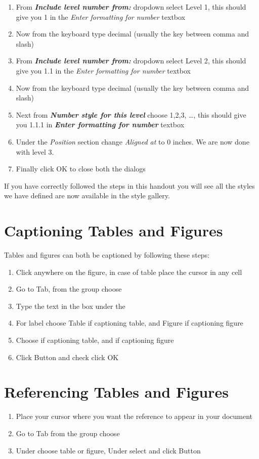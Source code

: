 \begin{enumerate}
    \item From \textbf{\emph{Include level number from: }} dropdown select Level 1, this should give you 1 in the \emph{Enter formatting for number} textbox
     \item Now from the keyboard type decimal (usually the key between comma and slash)
     \item From \textbf{\emph{Include level number from: }} dropdown select Level 2, this should give you 1.1 in the \emph{Enter formatting for number} textbox
     \item Now from the keyboard type decimal (usually the key between comma and slash)
     \item Next from \textbf{\emph{Number style for this level}} choose 1,2,3, \dots, this should give you 1.1.1 in \textbf{\emph{Enter formatting for number}} textbox
     \item Under the \emph{Position} section change \emph{Aligned at} to 0 inches. We are now done with level 3.
     \item Finally click OK to close both the dialogs
 \end{enumerate}
 If you have correctly followed the steps in this handout you will see all the styles we have defined are now available in the style gallery.
 \section{Captioning Tables and Figures}
     Tables and figures can both be captioned by following these steps:
     \begin{enumerate}
         \item Click anywhere on the figure, in case of table place the cursor in any cell
         \item Go to  Tab, from the  group choose 
         \item Type the text in the box under the  
         \item For label choose Table if captioning table, and Figure if captioning figure
         \item Choose  if captioning table, and  if captioning figure
         \item Click  Button and check  click OK
     \end{enumerate}
 \section{Referencing Tables and Figures}
     \begin{enumerate}
         \item Place your cursor where you want the reference to appear in your document
         \item Go to  Tab from the  group choose 
         \item Under  choose table or figure, Under  select  and click  Button
     \end{enumerate}
